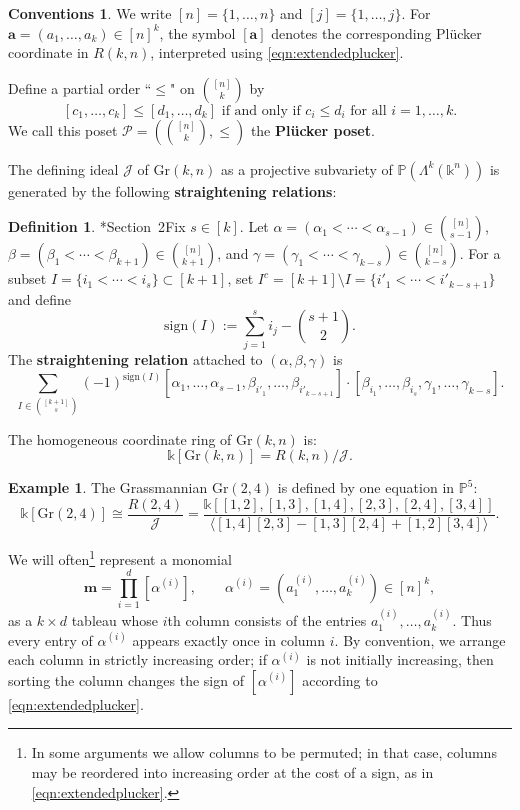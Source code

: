 \documentclass[12pt,reqno]{amsart}
\theoremstyle{definition}
\newtheorem{definition}[lemma]{Definition}
\newtheorem{example}[lemma]{Example}
\newtheorem*{conventions}{Conventions}
\newcommand{\sgn}{\text{sign}}
\renewcommand{\aa}{\mathbf a}
\newcommand{\mm}{\mathbf m}
\renewcommand{\k}{\mathbb{k}}
\newcommand{\cJ}{\mathcal{J}}
\newcommand{\cP}{\mathcal{P}}
\newcommand{\gr}{\mathrm{Gr}}
\begin{document}
\begin{conventions}
We write \([n]=\{1,\dots,n\}\) and \([j]=\{1,\dots,j\}\).
For \(\aa=(a_1,\dots,a_k)\in [n]^k\), the symbol \([\aa]\) denotes the corresponding
Pl\"ucker coordinate in \(R(k,n)\), interpreted using \eqref{eqn:extendedplucker}.
\end{conventions}

Define a partial order ``$\leq$" on ${[n]\choose k}$ by 
$$
[c_1,\dots, c_k] \leq [d_1,\dots, d_k] \text{ if and only if } c_i\leq d_i \text{ for all } i=1,\dots, k.
$$
We call this poset $\cP = ({[n]\choose k}, \leq)$ the \textbf{Pl\"{u}cker poset}.

The defining ideal $\cJ$ of $\gr(k,n)$ as a projective subvariety of $\mathbb{P}(\Lambda^k(\k^n))$ is generated by the following \textbf{straightening relations}:

\begin{definition}\cite{SturmfelsWhite}*{Section~2}\label{def:Pluckerrelations}
Fix \(s\in [k]\).
Let \(\alpha=(\alpha_1<\cdots<\alpha_{s-1})\in \binom{[n]}{s-1}\),
\(\beta=(\beta_1<\cdots<\beta_{k+1})\in \binom{[n]}{k+1}\),
and \(\gamma=(\gamma_1<\cdots<\gamma_{k-s})\in \binom{[n]}{k-s}\).
For a subset \(I=\{i_1<\cdots<i_s\}\subset [k+1]\), set
\(I^c=[k+1]\setminus I=\{i'_1<\cdots<i'_{k-s+1}\}\) and define
\[
\sgn(I):=\sum_{j=1}^s i_j-\binom{s+1}{2}.
\]
The \textbf{straightening relation} attached to \((\alpha,\beta,\gamma)\) is
\[
\sum_{I\in \binom{[k+1]}{s}}(-1)^{\sgn(I)}
[\alpha_1,\dots,\alpha_{s-1},\beta_{i'_1},\dots,\beta_{i'_{k-s+1}}]\cdot
[\beta_{i_1},\dots,\beta_{i_s},\gamma_1,\dots,\gamma_{k-s}].
\]
\end{definition}



The homogeneous coordinate ring of $\gr(k,n)$ is: 
\[\k[\gr(k,n)] = R(k,n)/\cJ.\]

\begin{example}
    The Grassmannian $\gr(2,4)$ is defined by one equation in $\mathbb{P}^5$:
    $$
\k[\gr(2,4)] \cong \frac{R(2,4)}{\cJ} = \frac{\k[[1,2],[1,3],[1,4],[2,3],[2,4],[3,4]]}{\langle [1,4][2,3] - [1,3][2,4] + [1,2][3,4]\rangle}.
$$
\end{example}



We will often\footnote{In some arguments we allow columns to be permuted; in that case, columns may be reordered into increasing order at the cost of a sign, as in \eqref{eqn:extendedplucker}.} represent a monomial
\[
\mm=\prod_{i=1}^d [\alpha^{(i)}], \qquad \alpha^{(i)}=(a^{(i)}_1,\dots,a^{(i)}_k)\in [n]^k,
\]
as a \(k\times d\) tableau whose \(i\)th column consists of the entries \(a^{(i)}_1,\dots,a^{(i)}_k\).
Thus every entry of \(\alpha^{(i)}\) appears exactly once in column \(i\).
By convention, we arrange each column in strictly increasing order; if \(\alpha^{(i)}\) is not initially increasing, then sorting the column changes the sign of \([\alpha^{(i)}]\) according to \eqref{eqn:extendedplucker}.
\end{document}
